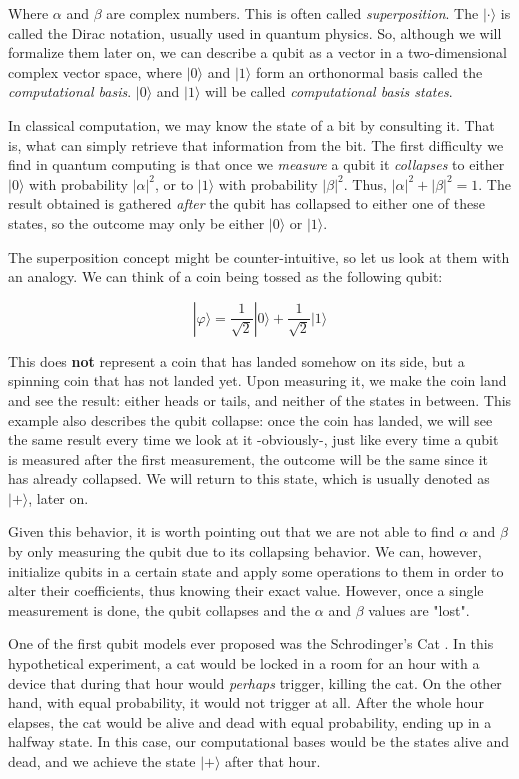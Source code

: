 Where $\alpha$ and $\beta$ are complex numbers. This is often called \emph{superposition}. The $| \cdot \rangle$ is called the Dirac notation, usually used in quantum physics. So, although we will formalize them later on, we can describe a qubit as a vector in a two-dimensional complex vector space, where $|0\rangle$ and $|1\rangle$ form an orthonormal basis called the \emph{computational basis}. $|0\rangle$ and $|1\rangle$ will be called \emph{computational basis states}.

In classical computation, we may know the state of a bit by consulting it. That is, what can simply retrieve that information from the bit. The first difficulty we find in quantum computing is that once we \emph{measure} a qubit it \emph{collapses} to either $|0\rangle$ with probability $|\alpha|^2$, or to $|1\rangle$ with probability $|\beta|^2$. Thus, $|\alpha|^2 + |\beta|^2 = 1$. The result obtained is gathered \emph{after} the qubit has collapsed to either one of these states, so the outcome may only be either $|0\rangle$ or $|1\rangle$.

The superposition concept might be counter-intuitive, so let us look at them with an analogy. We can think of a coin being tossed as the following qubit:

$$ |\varphi\rangle = \frac{1}{\sqrt{2}} |0\rangle + \frac{1}{\sqrt{2}} |1\rangle $$

This does \textbf{not} represent a coin that has landed somehow on its side, but a spinning coin that has not landed yet. Upon measuring it, we make the coin land and see the result: either heads or tails, and neither of the states in between. This example also describes the qubit collapse: once the coin has landed, we will see the same result every time we look at it -obviously-, just like every time a qubit is measured after the first measurement, the outcome will be the same since it has already collapsed. We will return to this state, which is usually denoted as $|+\rangle$, later on.

Given this behavior, it is worth pointing out that we are not able to find $\alpha$ and $\beta$ by only measuring the qubit due to its collapsing behavior. We can, however, initialize qubits in a certain state and apply some operations to them in order to alter their coefficients, thus knowing their exact value. However, once a single measurement is done, the qubit collapses and the $\alpha$ and $\beta$ values are "lost".

One of the first qubit models ever proposed was the Schrodinger's Cat \cite{Schrodinger1935} \cite{Schrodinger1935a}. In this hypothetical experiment, a cat would be locked in a room for an hour with a device that during that hour would \emph{perhaps} trigger, killing the cat. On the other hand, with equal probability, it would not trigger at all. After the whole hour elapses, the cat would be alive and dead with equal probability, ending up in a halfway state. In this case, our computational bases would be the states alive and dead, and we achieve the state $|+\rangle$ after that hour.

